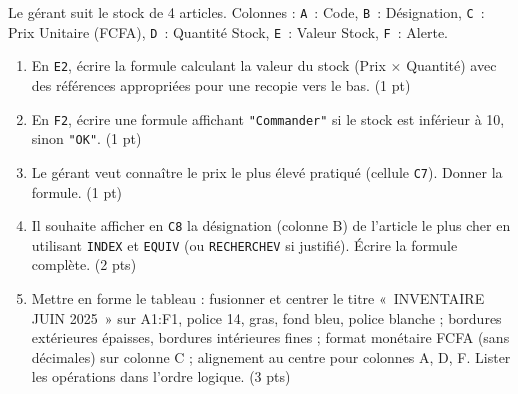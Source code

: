 \documentclass[11pt]{article}
\begin{document}
\begin{exercice}
Le gérant suit le stock de 4 articles. Colonnes : \texttt{A}~: Code, \texttt{B}~: Désignation, \texttt{C}~: Prix Unitaire (FCFA), \texttt{D}~: Quantité Stock, \texttt{E}~: Valeur Stock, \texttt{F}~: Alerte.

\begin{enumerate}
\item En \texttt{E2}, écrire la formule calculant la valeur du stock (Prix $\times$ Quantité) avec des références appropriées pour une recopie vers le bas. (1 pt)
\item En \texttt{F2}, écrire une formule affichant \texttt{"Commander"} si le stock est inférieur à 10, sinon \texttt{"OK"}. (1 pt)
\item Le gérant veut connaître le prix le plus élevé pratiqué (cellule \texttt{C7}). Donner la formule. (1 pt)
\item Il souhaite afficher en \texttt{C8} la désignation (colonne B) de l'article le plus cher en utilisant \texttt{INDEX} et \texttt{EQUIV} (ou \texttt{RECHERCHEV} si justifié). Écrire la formule complète. (2 pts)
\item Mettre en forme le tableau : fusionner et centrer le titre «~INVENTAIRE JUIN 2025~» sur A1:F1, police 14, gras, fond bleu, police blanche ; bordures extérieures épaisses, bordures intérieures fines ; format monétaire FCFA (sans décimales) sur colonne C ; alignement au centre pour colonnes A, D, F. Lister les opérations dans l'ordre logique. (3 pts)
\end{enumerate}
\end{exercice}
\end{document}
